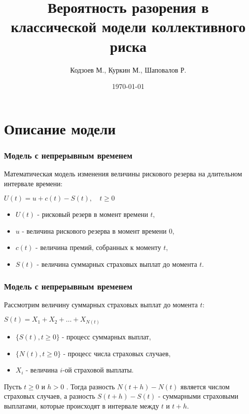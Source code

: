 \documentclass[10pt]{beamer}
\title[Модель коллективного риска]{Вероятность разорения в классической модели коллективного риска}
\author{Кодзоев М., Куркин М., Шаповалов Р.}
\institute[ВМК МГУ]
{
Московский Государственный Университет им. Ломоносова
}
\date{\today}
\begin{document}
\begin{frame}       
\titlepage
\end{frame}


\begin{frame}
\tableofcontents
\end{frame}


\section{Описание модели}
\begin{frame}
\frametitle{Модель с непрерывным временем}
\begin{flushleft}
Математическая модель изменения величины рискового резерва на длительном интервале времени:
\end{flushleft}

$U(t) = u + c(t) - S(t),\quad t \geq 0$
\begin{itemize}
    \item $U(t)$ - рисковый резерв в момент времени $t$,
    \item $u$ - величина рискового резерва в момент времени 0,
    \item $c(t)$ - величина премий, собранных к моменту $t$,
    \item $S(t)$ - величина суммарных страховых выплат до момента $t$.
\end{itemize}
\end{frame}


\begin{frame}
\frametitle{Модель с непрерывным временем}
\noindent
Рассмотрим величину суммарных страховых выплат до момента $t$:
\par\medskip
$S(t) = X_{1}+X_{2}+...+X_{N(t)}$
\begin{itemize}
    \item $\{S(t), t \geq 0\}$ - процесс суммарных выплат,
    \item $\{N(t), t \geq 0\}$ - процесс числа страховых случаев,
    \item $X_i$ - величина $i$-ой страховой выплаты.
\end{itemize}
\par\medskip \noindent
Пусть $t\geq 0$ и $h> 0$ . Тогда разность $N(t+h)-N(t)$ является числом страховых случаев, а разность $S(t+h) -S(t)$ - суммарными страховыми выплатами, которые происходят в интервале между $t$ и $t + h$.
\end{frame}
\end{document}
